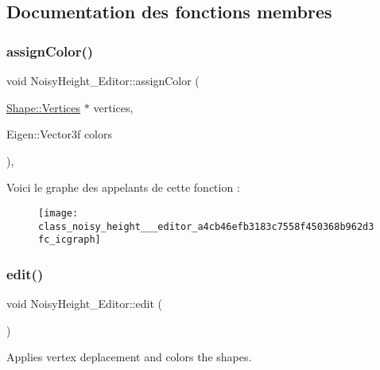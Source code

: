 \subsection{Documentation des fonctions membres}
\mbox{\label{class_noisy_height___editor_a4cb46efb3183c7558f450368b962d3fc}} 
\subsubsection{\texorpdfstring{assign\+Color()}{assignColor()}}
{\footnotesize\ttfamily void Noisy\+Height\+\_\+\+Editor\+::assign\+Color (\begin{DoxyParamCaption}\item[{\hyperlink{struct_shape_1_1_vertices}{Shape\+::\+Vertices} $\ast$}]{vertices,  }\item[{Eigen\+::\+Vector3f}]{colors }\end{DoxyParamCaption})\hspace{0.3cm}{\ttfamily [inline]}, {\ttfamily [protected]}}

Voici le graphe des appelants de cette fonction \+:\nopagebreak
\begin{figure}[H]
\begin{center}
\leavevmode
\texttt{[image: class\_noisy\_height\_\_\_editor\_a4cb46efb3183c7558f450368b962d3fc\_icgraph]}
\end{center}
\end{figure}
\mbox{\label{class_noisy_height___editor_a3ed5c7267dec56ff2f21366ce2ae9818}} 
\subsubsection{\texorpdfstring{edit()}{edit()}}
{\footnotesize\ttfamily void Noisy\+Height\+\_\+\+Editor\+::edit (\begin{DoxyParamCaption}{ }\end{DoxyParamCaption})\hspace{0.3cm}{\ttfamily [virtual]}}



Applies vertex deplacement and colors the shapes. 



